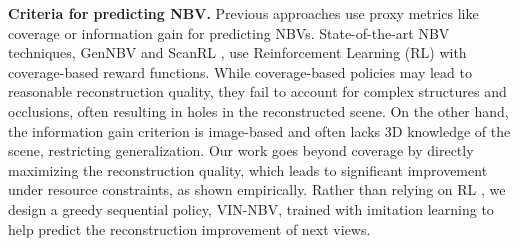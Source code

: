 \noindent\textbf{Criteria for predicting NBV.} Previous approaches use proxy metrics like coverage \cite{maver1993occlusions, peralta2020next, drone_save, hepp2018learn, chen2024gennbv} or information gain \cite{lee2022uncertaintyguidedpolicyactive, Islerinformationgainvolumetric3d, POTTHAST2014148, jiang2023fisherrf} for predicting NBVs. State-of-the-art NBV techniques, GenNBV \cite{chen2024gennbv} and ScanRL \cite{peralta2020next}, use Reinforcement Learning (RL) with coverage-based reward functions. While coverage-based policies may lead to reasonable reconstruction quality, they fail to account for complex structures and occlusions, often resulting in holes in the reconstructed scene. On the other hand, the information gain criterion is image-based and often lacks 3D knowledge of the scene, restricting generalization. Our work goes beyond coverage by directly maximizing the reconstruction quality, which leads to significant improvement under resource constraints, as shown empirically. Rather than relying on RL \cite{peralta2020next,chen2024gennbv}, we design a greedy sequential policy, VIN-NBV, trained with imitation learning to help predict the reconstruction improvement of next views.
